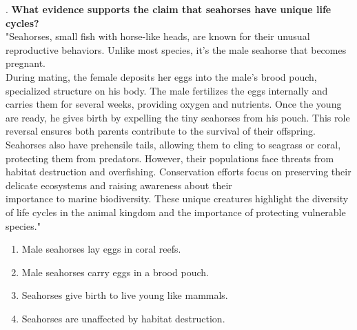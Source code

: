\documentclass[12pt]{article}
\begin{document}
\vspace{1cm}
. \textbf{What evidence supports the claim that seahorses have unique life cycles?}\\
"Seahorses, small fish with horse-like heads, are known for their unusual reproductive behaviors. Unlike most species, it’s the male seahorse that becomes pregnant. \\During mating, the female deposits her eggs into the male’s brood pouch,  
 \\specialized structure on his body. The male fertilizes the eggs internally and carries them for several weeks, providing oxygen and nutrients. Once the young are ready, he gives birth by expelling the tiny seahorses from his pouch. This role reversal ensures both parents contribute to the survival of their offspring. Seahorses also have prehensile tails, allowing them to cling to seagrass or coral, protecting them from predators. However, their populations face threats from habitat destruction and overfishing. Conservation efforts focus on preserving their delicate ecosystems and raising awareness about their \\importance to marine biodiversity. These unique creatures highlight the diversity of life cycles in the animal kingdom and the importance of protecting vulnerable species."  
\begin{enumerate}[label=\Alph*.]
    \item Male seahorses lay eggs in coral reefs.  
    \item Male seahorses carry eggs in a brood pouch.  
    \item Seahorses give birth to live young like mammals.  
    \item Seahorses are unaffected by habitat destruction.  
\end{enumerate}

\vspace{1em}
\end{document}
